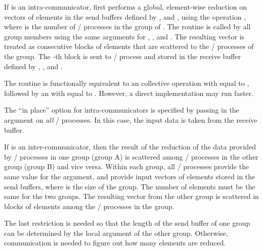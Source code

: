 If  is an intra-communicator, 
first performs a global, element-wise reduction on vectors of 
elements in the send buffers defined by ,  and ,
using the operation , where  is the number of \MPI/ processes in the group of .
The routine is called by all group members using the same arguments for ,
,  and .
The resulting vector is treated as  consecutive blocks of  elements
that are scattered to the \MPI/ processes of the group.
The -th block is sent to \MPI/ process  and stored in the receive buffer defined by
, , and .

\begin{implementors}
The  routine is functionally equivalent to
an  collective operation with  equal to ,
followed by an  with  equal to .
However, a direct implementation may run faster.
\end{implementors}

The ``in place'' option for intra-communicators is specified by passing 
in the  argument on \emph{all} \MPI/ processes.
In this case, the input data is taken from the receive buffer.

If  is an inter-communicator, then the result of the reduction of the data provided
by \MPI/ processes in one group (group A) is scattered among \MPI/ processes in the other group (group B) and vice versa.
Within each group, all \MPI/ processes provide the same value for the  argument,
and provide input vectors of  elements stored in the send buffers,
where  is the size of the group.
The number of elements  must be the same for the two groups.
The resulting vector from the other group is scattered in blocks of 
elements among the \MPI/ processes in the group.

\begin{rationale}
The last restriction is needed so that the length of the send buffer of one group can be
determined by the local  argument of the other group.
Otherwise, communication is needed to figure out how many elements are reduced.
\end{rationale}


